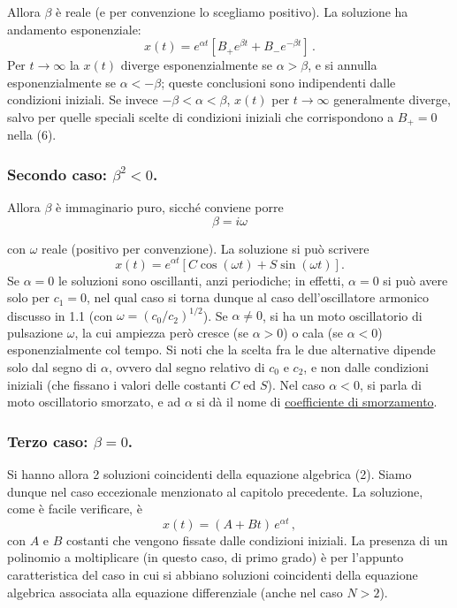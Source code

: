 \documentclass[11pt, a4paper]{book}
\numberwithin{equation}{section}
\begin{document}
Allora $\beta$ è reale (e per convenzione lo scegliamo positivo). La soluzione ha andamento esponenziale:
\begin{equation}
    x(t) = e^{\alpha t} \left[ B_+ e^{\beta t} + B_- e^{-\beta t} \right] \,.
\end{equation}
Per $t \to \infty$ la $x(t)$ diverge esponenzialmente se $\alpha > \beta$, e si annulla esponenzialmente se $\alpha < -\beta$; queste conclusioni sono indipendenti dalle condizioni iniziali. Se invece $-\beta < \alpha < \beta$, $x(t)$ per $t \to \infty$ generalmente diverge, salvo per quelle speciali scelte di condizioni iniziali che corrispondono a $B_+ = 0$ nella (6).

\subsubsection*{Secondo caso: $\beta^2 < 0$.}

Allora $\beta$ è immaginario puro, sicché conviene porre
\begin{equation}
    \beta = i\omega
\end{equation}


con $\omega$ reale (positivo per convenzione). La soluzione si può scrivere
\begin{equation}
    x(t) = e^{\alpha t} \left[ C \cos(\omega t) + S \sin(\omega t) \right] .
\end{equation}
Se $\alpha = 0$ le soluzioni sono oscillanti, anzi periodiche; in effetti,
$\alpha = 0$ si può avere solo per $c_1 = 0$, nel qual caso si torna dunque
al caso dell'oscillatore armonico discusso in 1.1 (con $\omega = (c_0/c_2)^{1/2}$).
Se $\alpha \neq 0$, si ha un moto oscillatorio di pulsazione $\omega$, la cui ampiezza
però cresce (se $\alpha > 0$) o cala (se $\alpha < 0$) esponenzialmente col
tempo. Si noti che la scelta fra le due alternative dipende solo dal segno di
$\alpha$, ovvero dal segno relativo di $c_0$ e $c_2$, e non dalle condizioni iniziali
(che fissano i valori delle costanti $C$ ed $S$). Nel caso $\alpha < 0$, si parla
di moto oscillatorio smorzato, e ad $\alpha$ si dà il nome di \uline{coefficiente di smorzamento}.

\subsubsection*{Terzo caso: $\beta = 0$.}

Si hanno allora 2 soluzioni coincidenti della equazione algebrica (2). Siamo
dunque nel caso eccezionale menzionato al capitolo precedente. La soluzione,
come è facile verificare, è
\begin{equation}
    x(t) = (A + B t) \, e^{\alpha t} \,,
\end{equation}
con $A$ e $B$ costanti che vengono fissate dalle condizioni iniziali. La presenza
di un polinomio a moltiplicare (in questo caso, di primo grado) è per l'appunto
caratteristica del caso in cui si abbiano soluzioni coincidenti della equazione
algebrica associata alla equazione differenziale (anche nel caso $N > 2$).
\end{document}
